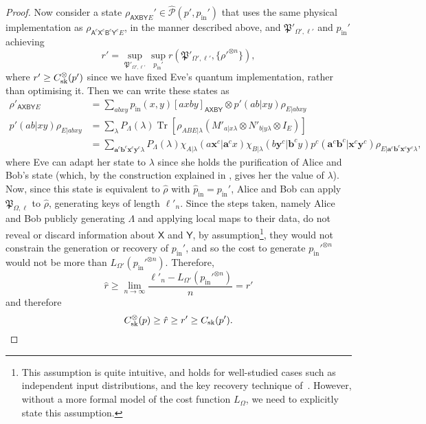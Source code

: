 \documentclass[10pt, a4paper]{article}
\numberwithin{equation}{section} %
\theoremstyle{definition}
\theoremstyle{plain}
\newcommand{\?}{\mathrel{?}} %
\newcommand{\cvec}[1]{\boldsymbol{\mathbf{#1}}}    %
\newcommand{\Tr}[2][]{\mathop{\mathrm{Tr}#1}\left[ #2 \right]} %
\newcommand{\crv}[1]{\mathsf{#1}}
\newcommand{\proj}[2][]{{[#2]}_{#1}}
\newcommand{\compatstates}[3][]{\hat{\mathcal{P}}#1(#2,#3)}
\newcommand{\proto}[2][_{\Omega,\ell}]{\mathfrak{#2}#1}
\newcommand{\prin}[1][p]{#1_{\mathrm{in}}}
\newcommand{\sk}{\rm sk}
\begin{document}
\begin{proof}
               Now consider a state \(\rho_{\crv{AXBY}{E}}' \in \compatstates{p'}{\prin'}\) that uses the same physical implementation as \(\rho_{\crv{A}^c\crv{X}^c \crv{B}^c\crv{Y}^c E}\), in the manner described above, and \(\proto['_{\Omega',\ell'}]{P}\) and \(\prin'\) achieving
               \[
                 r' = \sup_{\proto['_{\Omega',\ell'}]{P}} \sup_{\prin'} r(\proto['_{\Omega',\ell'}]{P}, \{\rho'^{\otimes{n}}\}),
               \]
               where \(r' \geq C_{\sk}^{\otimes}(p')\) since we have fixed Eve's quantum implementation, rather than optimising it. Then we can write these states as
      \begin{align*}
          \rho'_{\crv{A}\crv{X} \crv{B}\crv{Y} E} &= \sum_{abxy} \prin(x,y) \proj[\crv{A}\crv{X} \crv{B}\crv{Y}]{axby} \otimes p'(ab|xy) \rho_{E|abxy} \\
          p'(ab|xy) \rho_{E|abxy} &= \sum_{\lambda} P_{\Lambda}(\lambda) \Tr{ \rho_{ABE|\lambda} \left( M'_{a|x\lambda} \otimes N'_{b|y\lambda} \otimes I_{E} \right) } \\
                       &= \sum_{\cvec{a}^c\cvec{b}^c\cvec{x}^c\cvec{y}^c\lambda}
          P_{\Lambda}(\lambda) \chi_{A|\lambda}(a\cvec{x}^c|\cvec{a}^cx) \chi_{B|\lambda}(b\cvec{y}^c|\cvec{b}^cy)
          p^c(\cvec{a}^c\cvec{b}^c|\cvec{x}^c\cvec{y}^c)
          \rho_{E|\cvec{a}^c\cvec{b}^c \cvec{x}^c\cvec{y}^c\lambda},
      \end{align*}
      where Eve can adapt her state to \(\lambda\) since she holds the purification of Alice and Bob's state (which, by the construction explained in , gives her the value of \(\lambda\)). Now, since this state is equivalent to \(\hat{\rho}\) with \(\prin[\hat{p}] = \prin'\), Alice and Bob can apply \(\proto{P}\) to \(\hat{\rho}\), generating keys of length \(\ell'_n\). Since the steps taken, namely Alice and Bob publicly generating \(\Lambda\) and applying local maps to their data, do not reveal or discard information about \(\crv{X}\) and \(\crv{Y}\), by assumption\footnote{This assumption is quite intuitive, and holds for well-studied cases such as independent input distributions, and the key recovery technique of~\cite[Prot. 2]{DIQKD_FiniteSize}. However, without a more formal model of the cost function \(L_{\Omega}\), we need to explicitly state this assumption.}, they would not constrain the generation or recovery of \(\prin'\), and so the cost to generate \(\prin'^{\otimes n}\) would not be more than \(L_{\Omega'}(\prin'^{\otimes n})\). Therefore,
      \[ \hat{r} \geq \lim_{n\to\infty} \frac{\ell'_n - L_{\Omega'}(\prin'^{\otimes n})}{n} = r' \]
      and therefore
      \begin{equation}
      C_{\sk}^{\otimes}(p) \geq \hat{r} \geq r' \geq C_{\sk}(p').
      \end{equation}
    \end{proof}
\end{document}
